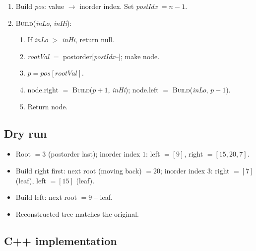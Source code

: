 \begin{enumerate}
  \item Build \textit{pos}: value $\to$ inorder index. Set
        \textit{postIdx} $=n-1$.
  \item \textsc{Build}(\textit{inLo}, \textit{inHi}):
  \begin{enumerate}
    \item If \textit{inLo} $>$ \textit{inHi}, return null.
    \item \textit{rootVal} $=$ postorder[\textit{postIdx}--]; make node.
    \item $p=\textit{pos}[\textit{rootVal}]$.
    \item node.right $=$ \textsc{Build}($p+1$, \textit{inHi}); node.left
          $=$ \textsc{Build}(\textit{inLo}, $p-1$).
    \item Return node.
  \end{enumerate}
\end{enumerate}

\subsection*{Dry run}


\begin{itemize}
  \item Root $=3$ (postorder last); inorder index $1$: left $=[9]$, right
        $=[15,20,7]$.
  \item Build right first: next root (moving back) $=20$; inorder index
        $3$: right $=[7]$ (leaf), left $=[15]$ (leaf).
  \item Build left: next root $=9$ -- leaf.
  \item Reconstructed tree matches the original.
\end{itemize}

\subsection*{C++ implementation}

